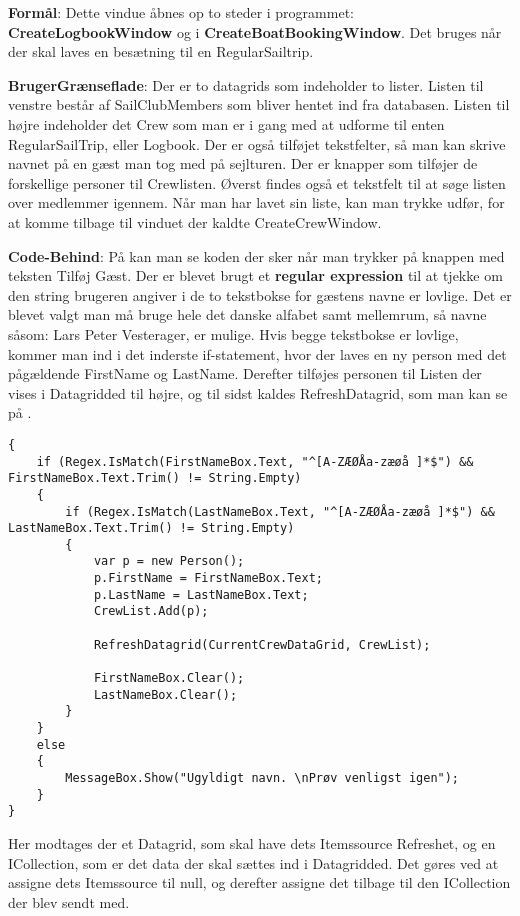 \textbf{Formål}: Dette vindue åbnes op to steder i programmet: \textbf{CreateLogbookWindow} og i \textbf{CreateBoatBookingWindow}. Det bruges når der skal laves en besætning til en RegularSailtrip.  

\textbf{BrugerGrænseflade}: Der er to datagrids som indeholder to lister. Listen til venstre består af SailClubMembers som bliver hentet ind fra databasen. Listen til højre indeholder det Crew som man er i gang med at udforme til enten RegularSailTrip, eller Logbook. Der er også tilføjet tekstfelter, så man kan skrive navnet på en gæst man tog med på sejlturen. Der er knapper som tilføjer de forskellige personer til Crewlisten. Øverst findes også et tekstfelt til at søge listen over medlemmer igennem. Når man har lavet sin liste, kan man trykke udfør, for at komme tilbage til vinduet der kaldte CreateCrewWindow.

\textbf{Code-Behind}: 
På  kan man se koden der sker når man trykker på knappen med teksten Tilføj Gæst.
Der er blevet brugt et \textbf{regular expression} til at tjekke om den string brugeren angiver i de to tekstbokse for gæstens navne er lovlige. 
Det er blevet valgt man må bruge hele det danske alfabet samt mellemrum, så navne såsom: Lars Peter Vesterager, er mulige.
Hvis begge tekstbokse er lovlige, kommer man ind i det inderste if-statement, hvor der laves en ny person med det pågældende FirstName og LastName. 
Derefter tilføjes personen til Listen der vises i Datagridded til højre, og til sidst kaldes RefreshDatagrid, som man kan se på .

\begin{lstlisting}[frame=single, caption=Add Guest Buttton, label=AddGuestButton]
{
    if (Regex.IsMatch(FirstNameBox.Text, "^[A-ZÆØÅa-zæøå ]*$") && FirstNameBox.Text.Trim() != String.Empty)
    {
        if (Regex.IsMatch(LastNameBox.Text, "^[A-ZÆØÅa-zæøå ]*$") && LastNameBox.Text.Trim() != String.Empty)
        {
            var p = new Person();
            p.FirstName = FirstNameBox.Text;
            p.LastName = LastNameBox.Text;
            CrewList.Add(p);

            RefreshDatagrid(CurrentCrewDataGrid, CrewList);

            FirstNameBox.Clear();
            LastNameBox.Clear();
        }
    }
    else
    {
        MessageBox.Show("Ugyldigt navn. \nPrøv venligst igen");
    }
}      
\end{lstlisting}

Her modtages der et Datagrid, som skal have dets Itemssource Refreshet, og en ICollection, som er det data der skal sættes ind i Datagridded. 
Det gøres ved at assigne dets Itemssource til null, og derefter assigne det tilbage til den ICollection der blev sendt med. 

